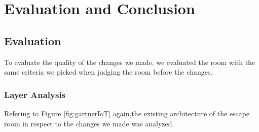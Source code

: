 
\chapter{Evaluation and Conclusion} %

\label{Chapter5} %

\section{Evaluation}
To evaluate the quality of the changes we made, 
we evaluated the room with the same criteria we picked when judging the room before the changes.

\subsection{Layer Analysis}
Refering to Figure \ref{fig:gartnerIoT} again,the existing architecture of the escape room in respect to the changes we made was analyzed.

